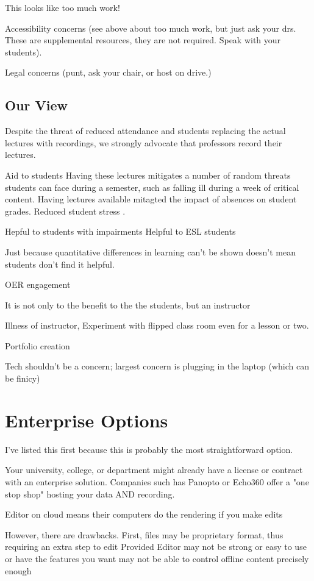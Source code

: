 \documentclass[sigconf]{acmart}
\begin{document}
This looks like too much work!

Accessibility concerns (see above about too much work, but just ask your drs.  These are supplemental resources, they are not required.  Speak with your students).

Legal concerns (punt, ask your chair, or host on drive.)


\subsection{Our View}
Despite the threat of reduced attendance and students replacing the actual lectures with recordings, we strongly advocate that professors record their lectures.


Aid to students
Having these lectures mitigates a number of random threats students can face during a semester, such as falling ill during a week of critical content.
Having lectures available mitagted the impact of absences on student grades\cite{traphagan2010impact}.
Reduced student stress \cite{traphagan2010impact}.

Hepful to students with impairments 
Helpful to ESL students


Just because quantitative differences in learning can't be shown doesn't mean students don't find it helpful.


OER engagement \cite{llamas2014generating}


It is not only to the benefit to the the students, but an instructor

Illness of instructor, 
Experiment with flipped class room even for a lesson or two.

Portfolio creation

Tech shouldn't be a concern; largest concern is plugging in the laptop (which can be finicy)

\section{Enterprise Options}
I've listed this first because this is probably the most straightforward option.

Your university, college, or department might already have a license or contract with an enterprise solution.
Companies such has Panopto or Echo360 offer a "one stop shop" hosting your data AND recording.


Editor on cloud means their computers do the rendering if you make edits

However, there are drawbacks.
First, files may be proprietary format, thus requiring an extra step to edit
Provided Editor may not be strong or easy to use or have the features you want
may not be able to control offline content precisely enough
\end{document}
